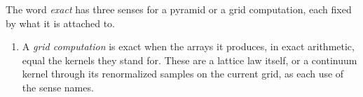 \begin{definition}
\label{def:exact-senses}
\leanok
The word \emph{exact} has three senses for a pyramid or a grid computation, each fixed by what it
is attached to.
\begin{enumerate}
\item A \emph{grid computation} is exact when the arrays it produces, in exact arithmetic, equal
the kernels they stand for. These are a lattice law itself, or a continuum kernel through its renormalized samples on the current grid, as each use of the sense names.

\end{enumerate}
\end{definition}

